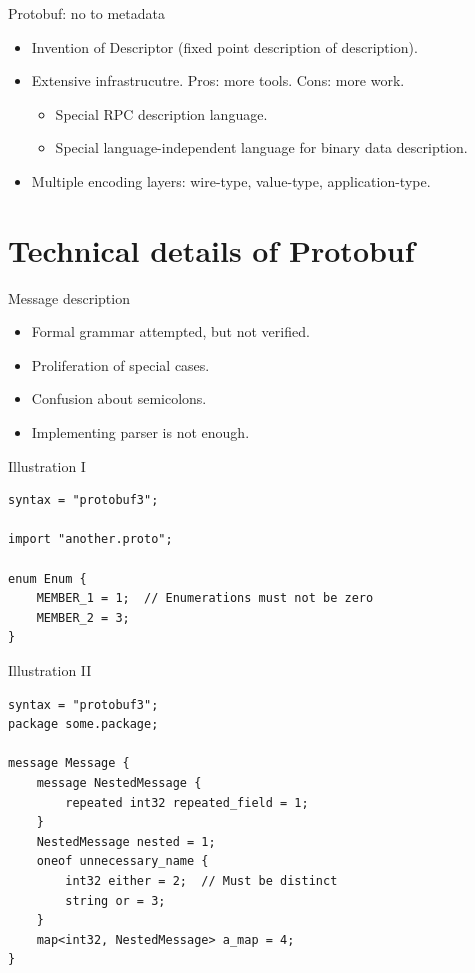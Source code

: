 \documentclass[presentation]{beamer}
\begin{document}
\begin{frame}[label={sec:orgfdf0a44}]{Protobuf: no to metadata}
\begin{itemize}
\item Invention of Descriptor (fixed point description of description).
\item Extensive infrastrucutre.  Pros: more tools.  Cons: more work.
\begin{itemize}
\item Special RPC description language.
\item Special language-independent language for binary data
description.
\end{itemize}
\item Multiple encoding layers: wire-type, value-type,
application-type.
\end{itemize}
\end{frame}

\section{Technical details of Protobuf}
\label{sec:orgcab892d}

\begin{frame}[label={sec:orge2adeac}]{Message description}
\begin{itemize}
\item Formal grammar attempted, but not verified.
\item Proliferation of special cases.
\item Confusion about semicolons.
\item Implementing parser is not enough.
\end{itemize}
\end{frame}

\begin{frame}[fragile,label={sec:org065477a}]{Illustration I}
 \begin{verbatim}
syntax = "protobuf3";

import "another.proto";

enum Enum {
    MEMBER_1 = 1;  // Enumerations must not be zero
    MEMBER_2 = 3;
}
\end{verbatim}
\end{frame}

\begin{frame}[fragile,label={sec:org45bf4c4}]{Illustration II}
 \begin{verbatim}
syntax = "protobuf3";
package some.package;

message Message {
    message NestedMessage {
        repeated int32 repeated_field = 1;
    }
    NestedMessage nested = 1;
    oneof unnecessary_name {
        int32 either = 2;  // Must be distinct
        string or = 3;
    }
    map<int32, NestedMessage> a_map = 4;
}
\end{verbatim}
\end{frame}
\end{document}
